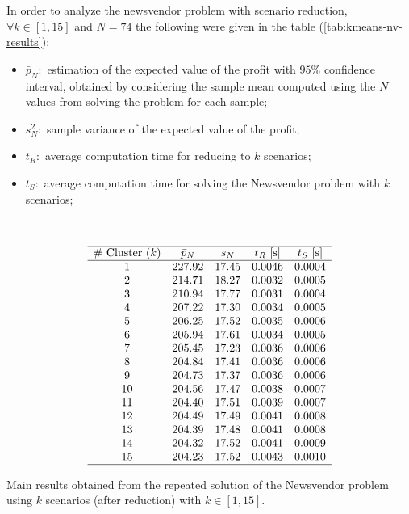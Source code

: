 \documentclass[a4paper,12pt]{article}
\begin{document}
	In order to analyze the newsvendor problem with scenario reduction, $\forall k \in [1,15]$ and $N = 74$ the following were given in the table (\ref{tab:kmeans-nv-results}):
	\begin{itemize}
		\item $\bar{p}_{N}:$ estimation of the expected value of the profit with $95\%$ confidence interval, obtained by considering the sample mean computed using the $N$ values from solving the problem for each sample; 
		\item $s^{2}_{N}:$ sample variance of the expected value of the profit;
		\item $t_{R}:$ average computation time for reducing to $k$ scenarios;
		\item $t_{S}:$ average computation time for solving the Newsvendor problem with $k$ scenarios;
	\end{itemize}~
	\begin{table}[H]
		\[
		\begin{array}{ccccc}
			\hline
			\text{\# Cluster $(k)$} & \text{$\bar{p}_{N}$} & \text{$s_{N}$} & \text{$t_{R}$ [s]} & \text{$t_{S}$ [s]} \\
			\hline
			1 & 227.92 & 17.45 & 0.0046 & 0.0004 \\
			2 & 214.71 & 18.27 & 0.0032 & 0.0005 \\
			3 & 210.94 & 17.77 & 0.0031 & 0.0004 \\
			4 & 207.22 & 17.30 & 0.0034 & 0.0005 \\
			5 & 206.25 & 17.52 & 0.0035 & 0.0006 \\
			6 & 205.94 & 17.61 & 0.0034 & 0.0005 \\
			7 & 205.45 & 17.23 & 0.0036 & 0.0006 \\
			8 & 204.84 & 17.41 & 0.0036 & 0.0006 \\
			9 & 204.73 & 17.37 & 0.0036 & 0.0006 \\
			10 & 204.56 & 17.47 & 0.0038 & 0.0007 \\
			11 & 204.40 & 17.51 & 0.0039 & 0.0007 \\
			12 & 204.49 & 17.49 & 0.0041 & 0.0008 \\
			13 & 204.39 & 17.48 & 0.0041 & 0.0008 \\
			14 & 204.32 & 17.52 & 0.0041 & 0.0009 \\
			15 & 204.23 & 17.52 & 0.0043 & 0.0010 \\
			\hline
		\end{array}
		\]
		\label{tab:kmeans-nv-results}
		\caption{Main results obtained from the repeated solution of the Newsvendor problem using $k$ scenarios (after reduction) with $k \in [1,15]$.}
	\end{table}
		
\end{document}
